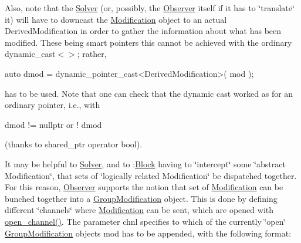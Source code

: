Also, note that the \mbox{\hyperlink{class_s_m_spp__di__unipi__it_1_1_solver}{Solver}} (or, possibly, the \mbox{\hyperlink{class_s_m_spp__di__unipi__it_1_1_observer}{Observer}} itself if it has to \char`\"{}translate\char`\"{} it) will have to downcast the \mbox{\hyperlink{class_s_m_spp__di__unipi__it_1_1_modification}{Modification}} object to an actual Derived\+Modification in order to gather the information about what has been modified. These being smart pointers this cannot be achieved with the ordinary dynamic\+\_\+cast$<$$>$; rather, \begin{DoxyVerb}auto dmod = dynamic_pointer_cast<DerivedModification>( mod );
\end{DoxyVerb}


has to be used. Note that one can check that the dynamic cast worked as for an ordinary pointer, i.\+e., with \begin{DoxyVerb}dmod != nullptr       or        ! dmod
\end{DoxyVerb}


(thanks to shared\+\_\+ptr operator bool).

It may be helpful to \mbox{\hyperlink{class_s_m_spp__di__unipi__it_1_1_solver}{Solver}}, and to \+:\mbox{\hyperlink{class_s_m_spp__di__unipi__it_1_1_block}{Block}} having to \char`\"{}intercept\char`\"{} some \char`\"{}abstract Modification\char`\"{}, that sets of \char`\"{}logically related Modification\char`\"{} be dispatched together. For this reason, \mbox{\hyperlink{class_s_m_spp__di__unipi__it_1_1_observer}{Observer}} supports the notion that set of \mbox{\hyperlink{class_s_m_spp__di__unipi__it_1_1_modification}{Modification}} can be bunched together into a \mbox{\hyperlink{class_s_m_spp__di__unipi__it_1_1_group_modification}{Group\+Modification}} object. This is done by defining different \char`\"{}channels\char`\"{} where \mbox{\hyperlink{class_s_m_spp__di__unipi__it_1_1_modification}{Modification}} can be sent, which are opened with \mbox{\hyperlink{class_s_m_spp__di__unipi__it_1_1_observer_acf7e46d450779f524e3655c5f31eecc8}{open\+\_\+channel()}}. The parameter chnl specifies to which of the currently \char`\"{}open\char`\"{} \mbox{\hyperlink{class_s_m_spp__di__unipi__it_1_1_group_modification}{Group\+Modification}} objects mod has to be appended, with the following format\+:


